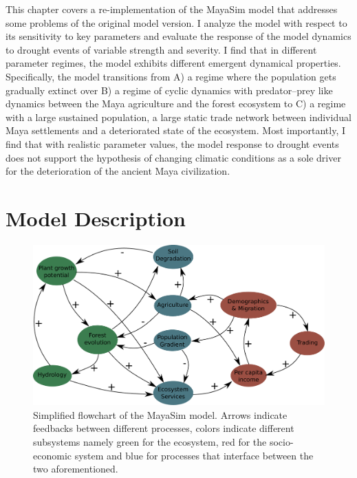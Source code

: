This chapter covers a re-implementation of the MayaSim model that addresses some problems of the original model version. I analyze the model with respect to its sensitivity to key parameters and evaluate the response of the model dynamics to drought events of variable strength and severity. I find that in different parameter regimes, the model exhibits different emergent dynamical properties. Specifically, the model transitions from A) a regime where the population gets gradually extinct over B) a regime of cyclic dynamics with predator--prey like dynamics between the Maya agriculture and the forest ecosystem to C) a regime with a large sustained population, a large static trade network between individual Maya settlements and a deteriorated state of the ecosystem. Most importantly, I find that with realistic parameter values, the model response to drought events does not support the hypothesis of changing climatic conditions as a sole driver for the deterioration of the ancient Maya civilization.

\section{Model Description}


\begin{figure}
    \centering
    \includegraphics[width=.9 \textwidth]{figures/model_flowchart.pdf}
    \caption{Simplified flowchart of the MayaSim model. Arrows indicate feedbacks between different processes, colors indicate different subsystems namely green for the ecosystem, red for the socio-economic system and blue for processes that interface between the two aforementioned.}
    \label{fig:my_label}
\end{figure}

